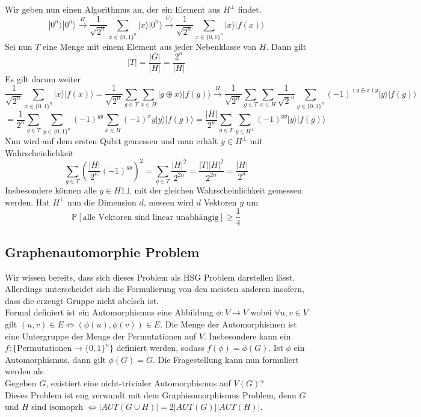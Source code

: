 \documentclass[a4paper, 12pt]{article}
\theoremstyle{plain}
\theoremstyle{definition}
\theoremstyle{lemma}
\theoremstyle{remark}
\theoremstyle{example}
\begin{document}
	Wir geben nun einen Algorithmus an, der ein Element aus $H^\bot$ findet. \[|0^n\rangle |0^n\rangle \overset{H}{\to} \frac{1}{\sqrt{2^n}} \sum_{x \in \{0,1\}^n} |x\rangle |0^n\rangle \overset{U_f}{\to} \frac{1}{\sqrt{2^n}}\sum_{x \in \{0,1\}^n} |x\rangle |f(x)\rangle\] Sei nun $T$ eine Menge mit einem Element aus jeder Nebenklasse von $H$. Dann gilt \[\left|T\right| = \frac{\left|G\right|}{\left|H\right|} = \frac{2^n}{\left|H\right|}\] Es gilt darum weiter \[\frac{1}{\sqrt{2^n}}\sum_{x \in \{0,1\}^n} |x\rangle |f(x)\rangle = \frac{1}{\sqrt{2^n}}\sum_{g \in T} \sum_{x \in H} |g\oplus x\rangle |f(g)\rangle \overset{H}{\to} \frac{1}{\sqrt{2^n}} \sum_{g \in T} \sum_{x \in H} \frac{1}{\sqrt{2}^n} \sum_{y \in \{0,1\}^n} (-1)^{(g\oplus x)y}|y\rangle |f(g)\rangle\]\[ = \frac{1}{2^n} \sum_{g \in T} \sum_{y \in \{0,1\}^n} (-1)^{gy}\sum_{x \in H} (-1)^xy|y\rangle|f(g)\rangle = \frac{\left|H\right|}{2^n} \sum_{g \in T} \sum_{y\in H^\bot} (-1)^{gy}|y\rangle |f(g)\rangle\]
	Nun wird auf dem ersten Qubit gemessen und man erhält $y \in H^\bot$ mit Wahrscheinlichkeit $$\sum_{g \in T} \left(\frac{\left|H\right|}{2^n} (-1)^{gy}\right)^2 = \sum_{g \in T} \frac{\left|H\right|^2}{2^{2n}} = \frac{\left|T\right| \left|H\right|^2}{2^{2n}} = \frac{\left|H\right|}{2^n}$$ Insbesondere können alle $y \in H1\bot$ mit der gleichen Wahrscheinlichkeit gemessen werden. Hat $H^\bot$ nun die Dimension $d$, messen wird $d$ Vektoren $y$ um \[\mathbb{P}[\text{alle Vektoren sind linear unabhängig}] \geq \frac{1}{4}\]
	\subsection{Graphenautomorphie Problem}
	Wir wissen bereits, dass sich dieses Problem als HSG Problem darstellen lässt. Allerdings unterscheidet sich die Formulierung von den meisten anderen insofern, dass die erzeugt Gruppe nicht abelsch ist.\\
	Formal definiert ist ein Automorphismus eine Abbildung $\phi: V \to V$ wobei $\forall u,v \in V$ gilt $(u,v) \in E \iff (\phi(u),\phi(v)) \in E$. Die Menge der Automorphismen ist eine Untergruppe der Menge der Permutationen auf $V$. Insbesondere kann ein $f: \{\text{Permutationen} \to \{0,1\}^n\}$ definiert werden, sodass $f(\phi) = \phi(G)$. Ist $\phi$ ein Automorphismus, dann gilt $\phi(G)=G$. Die Fragestellung kann nun formuliert werden als\\
	Gegeben $G$, existiert eine nicht-trivialer Automorphismus auf $V(G)$?\\
	Dieses Problem ist eng verwandt mit dem Graphisomorphismus Problem, denn $G$ und $H$ sind isomoprh $\iff \left|AUT(G\cup H)\right| = 2\left|AUT(G)\right|\left|AUT(H)\right|$.
\end{document}
